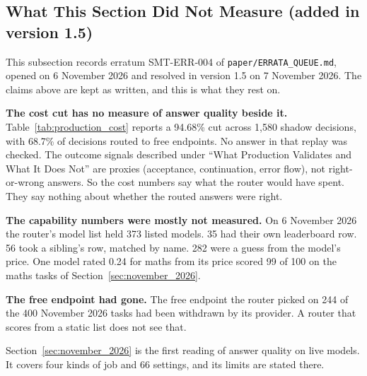 \subsection{What This Section Did Not Measure (added in version 1.5)}
\label{sec:not_measured}

This subsection records erratum SMT-ERR-004 of \texttt{paper/ERRATA\_QUEUE.md}, opened on 6 November 2026 and resolved in version 1.5 on 7 November 2026. The claims above are kept as written, and this is what they rest on.

\textbf{The cost cut has no measure of answer quality beside it.} Table~\ref{tab:production_cost} reports a 94.68\% cut across 1{,}580 shadow decisions, with 68.7\% of decisions routed to free endpoints. No answer in that replay was checked. The outcome signals described under ``What Production Validates and What It Does Not'' are proxies (acceptance, continuation, error flow), not right-or-wrong answers. So the cost numbers say what the router would have spent. They say nothing about whether the routed answers were right.

\textbf{The capability numbers were mostly not measured.} On 6 November 2026 the router's model list held 373 listed models. 35 had their own leaderboard row. 56 took a sibling's row, matched by name. 282 were a guess from the model's price. One model rated 0.24 for maths from its price scored 99 of 100 on the maths tasks of Section~\ref{sec:november_2026}.

\textbf{The free endpoint had gone.} The free endpoint the router picked on 244 of the 400 November 2026 tasks had been withdrawn by its provider. A router that scores from a static list does not see that.

Section~\ref{sec:november_2026} is the first reading of answer quality on live models. It covers four kinds of job and 66 settings, and its limits are stated there.
